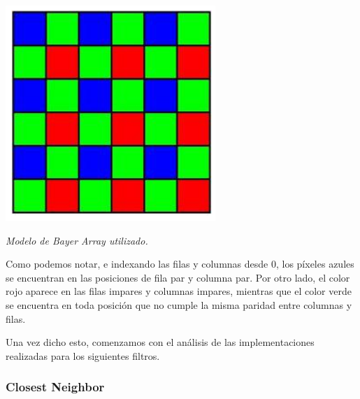 	\par 
	\begin{center}
		\includegraphics[scale=0.4]{./img/bayerarray.png}
		\par 
		\footnotesize\textit{Modelo de Bayer Array utilizado.}
	\end{center}
	\par 
	
Como podemos notar, e indexando las filas y columnas desde 0, los píxeles azules se encuentran en las posiciones de fila par y columna par. Por otro lado, el color rojo aparece en las filas impares y columnas impares, mientras que el color verde se encuentra en toda posición que no cumple la misma paridad entre columnas y filas.
\par 
Una vez dicho esto, comenzamos con el análisis de las implementaciones realizadas para los siguientes filtros.
	
\subsubsection{Closest Neighbor}


